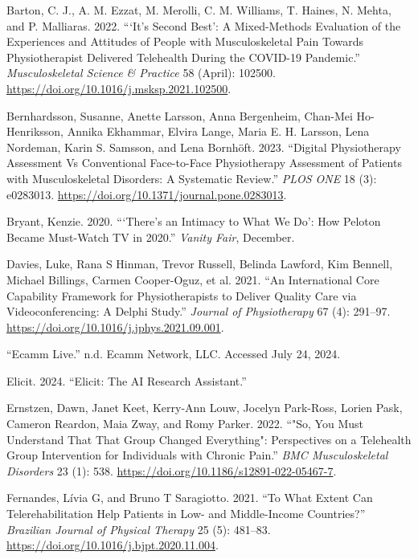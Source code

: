 \documentclass[
  letterpaper,
  DIV=11,
  numbers=noendperiod,
  oneside]{scrartcl}
\newlength{\cslhangindent}
\newenvironment{CSLReferences}[2] %
 {\begin{list}{}{%
  \setlength{\itemindent}{0pt}
  \setlength{\leftmargin}{0pt}
  \setlength{\parsep}{0pt}
  \ifodd #1
   \setlength{\leftmargin}{\cslhangindent}
   \setlength{\itemindent}{-1\cslhangindent}
  \fi
  \setlength{\itemsep}{#2\baselineskip}}}
 {\end{list}}
\begin{document}
\begin{CSLReferences}{1}{0}
Barton, C. J., A. M. Ezzat, M. Merolli, C. M. Williams, T. Haines, N.
Mehta, and P. Malliaras. 2022. {``{`{It}'s Second Best'}: {A}
Mixed-Methods Evaluation of the Experiences and Attitudes of People with
Musculoskeletal Pain Towards Physiotherapist Delivered Telehealth During
the {COVID-19} Pandemic.''} \emph{Musculoskeletal Science \& Practice}
58 (April): 102500. \url{https://doi.org/10.1016/j.msksp.2021.102500}.

Bernhardsson, Susanne, Anette Larsson, Anna Bergenheim, Chan-Mei
Ho-Henriksson, Annika Ekhammar, Elvira Lange, Maria E. H. Larsson, Lena
Nordeman, Karin S. Samsson, and Lena Bornhöft. 2023. {``Digital
Physiotherapy Assessment Vs Conventional Face-to-Face Physiotherapy
Assessment of Patients with Musculoskeletal Disorders: {A} Systematic
Review.''} \emph{PLOS ONE} 18 (3): e0283013.
\url{https://doi.org/10.1371/journal.pone.0283013}.

Bryant, Kenzie. 2020. {``{`{There}'s an {Intimacy} to {What We Do}'}:
{How Peloton Became Must-Watch TV} in 2020.''} \emph{Vanity Fair},
December.

Davies, Luke, Rana S Hinman, Trevor Russell, Belinda Lawford, Kim
Bennell, Michael Billings, Carmen Cooper-Oguz, et al. 2021. {``An
International Core Capability Framework for Physiotherapists to Deliver
Quality Care via Videoconferencing: A {Delphi} Study.''} \emph{Journal
of Physiotherapy} 67 (4): 291--97.
\url{https://doi.org/10.1016/j.jphys.2021.09.001}.

{``Ecamm {Live}.''} n.d. Ecamm Network, LLC. Accessed July 24, 2024.

Elicit. 2024. {``Elicit: {The AI Research Assistant}.''}

Ernstzen, Dawn, Janet Keet, Kerry-Ann Louw, Jocelyn Park-Ross, Lorien
Pask, Cameron Reardon, Maia Zway, and Romy Parker. 2022. {``"{So}, You
Must Understand That That Group Changed Everything": Perspectives on a
Telehealth Group Intervention for Individuals with Chronic Pain.''}
\emph{BMC Musculoskeletal Disorders} 23 (1): 538.
\url{https://doi.org/10.1186/s12891-022-05467-7}.

Fernandes, Lívia G, and Bruno T Saragiotto. 2021. {``To What Extent Can
Telerehabilitation Help Patients in Low- and Middle-Income Countries?''}
\emph{Brazilian Journal of Physical Therapy} 25 (5): 481--83.
\url{https://doi.org/10.1016/j.bjpt.2020.11.004}.


\end{CSLReferences}
\end{document}
